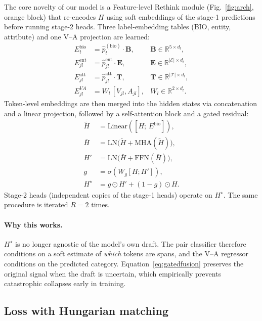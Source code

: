 \documentclass[runningheads]{llncs}
\begin{document}
The core novelty of our model is a Feature-level Rethink module
(Fig.~\ref{fig:arch}, orange block) that re-encodes $H$ using soft
embeddings of the stage-1 predictions before running stage-2 heads.
Three label-embedding tables (BIO, entity, attribute) and one V--A
projection are learned:
\begin{align}
E^\text{bio}_t &= \hat p_t^{(\text{bio})} \cdot \mathbf{B}, &
\mathbf{B} \in \mathbb{R}^{5\times d_l}, \\
E^\text{ent}_{jl} &= \hat p^\text{ent}_{jl} \cdot \mathbf{E}, &
\mathbf{E} \in \mathbb{R}^{|\mathcal{E}|\times d_l}, \\
E^\text{att}_{jl} &= \hat p^\text{att}_{jl} \cdot \mathbf{T}, &
\mathbf{T} \in \mathbb{R}^{|\mathcal{T}|\times d_l}, \\
E^{VA}_{jl} &= W_{l}\, [V_{jl}, A_{jl}], &
W_l \in \mathbb{R}^{2\times d_l}.
\end{align}
Token-level embeddings are then merged into the hidden states via
concatenation and a linear projection, followed by a self-attention
block and a gated residual:
\begin{align}
\tilde H &= \mathrm{Linear}([H;\, E^\text{bio}]), \\
\bar H   &= \mathrm{LN}\big(\tilde H + \mathrm{MHA}(\tilde H)\big), \\
H'       &= \mathrm{LN}\big(\bar H + \mathrm{FFN}(\bar H)\big), \\
g        &= \sigma(W_g [H; H']), \\
H^\star  &= g \odot H' + (1-g) \odot H.
\label{eq:gatedfusion}
\end{align}
Stage-2 heads (independent copies of the stage-1 heads) operate on
$H^\star$. The same procedure is iterated $R{=}2$ times.

\paragraph{Why this works.}
$H^\star$ is no longer agnostic of the model's own draft. The pair
classifier therefore conditions on a soft estimate of \emph{which}
tokens are spans, and the V--A regressor conditions on the predicted
category. Equation~\ref{eq:gatedfusion} preserves the original signal
when the draft is uncertain, which empirically prevents catastrophic
collapses early in training.

\subsection{Loss with Hungarian matching}
\label{sec:method:hungarian}
\end{document}
